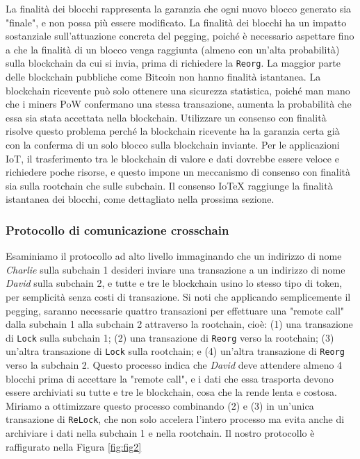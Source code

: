 La finalità dei blocchi rappresenta la garanzia che ogni nuovo blocco generato sia "finale", e non possa più essere
modificato. La finalità dei blocchi ha un impatto sostanziale sull'attuazione concreta del pegging,
poiché è necessario aspettare fino a che la finalità di un blocco venga raggiunta (almeno con un'alta probabilità) sulla blockchain da cui si invia, prima di richiedere la \texttt{Reorg}. La maggior parte delle blockchain pubbliche come Bitcoin non hanno finalità istantanea. La blockchain ricevente può solo ottenere una sicurezza statistica, poiché man mano che i miners PoW confermano una stessa transazione, aumenta la probabilità che essa sia stata accettata nella blockchain. Utilizzare un consenso con finalità risolve questo problema perché la blockchain ricevente ha la garanzia certa già con la conferma di un solo blocco sulla blockchain inviante. Per le applicazioni IoT, il trasferimento tra le blockchain di valore e dati dovrebbe essere veloce e richiedere poche risorse, e questo impone un meccanismo di consenso con finalità sia sulla rootchain che sulle subchain. Il consenso IoTeX raggiunge la finalità istantanea dei blocchi, come dettagliato nella prossima sezione.

\subsubsection{Protocollo di comunicazione crosschain}
Esaminiamo il protocollo ad alto livello immaginando che un indirizzo di nome \emph{Charlie} sulla
subchain 1 desideri inviare una transazione a un indirizzo di nome \emph{David} sulla subchain 2, e tutte e tre le blockchain usino lo stesso tipo di token, per semplicità senza costi di transazione. Si noti che applicando semplicemente il pegging, saranno necessarie quattro transazioni per effettuare una "remote call" dalla subchain 1 alla subchain 2 attraverso la rootchain, cioè: (1) una transazione di \texttt{Lock} sulla subchain 1; (2) una transazione di \texttt{Reorg} verso la rootchain; (3) un'altra transazione di \texttt{Lock} sulla rootchain; e (4) un'altra transazione di \texttt{Reorg} verso la subchain 2.
Questo processo indica che \emph{David} deve attendere almeno 4 blocchi prima di accettare la "remote call", e i dati che essa trasporta devono essere archiviati su tutte e tre le blockchain, cosa che la rende lenta e costosa. Miriamo a ottimizzare questo processo combinando (2) e (3) in un'unica transazione di \texttt{ReLock}, che non solo accelera l'intero processo ma
evita anche di archiviare i dati nella subchain 1 e nella rootchain. Il nostro protocollo è raffigurato nella Figura \ref{fig:fig2}

